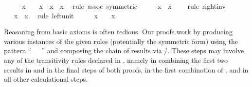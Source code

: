 \begin{isabellebody}
\ \ \isamarkupfalse%
\ \isamarkupfalse%
\ {}x\ {}\ {}\ {}\ {}x\ {}\ x{}{}\ {}\ x{}\ \isamarkupfalse%
\ {}rule\ assoc\ {}symmetric{}{}\isanewline
\ \ \isamarkupfalse%
\ \isamarkupfalse%
\ {}x\ {}\ x{}\ {}\ {}{}\ \isamarkupfalse%
\ {}rule\ right{}inv{}\isanewline
\ \ \isamarkupfalse%
\ \isamarkupfalse%
\ {}{}\ {}\ x\ {}\ x{}\ \isamarkupfalse%
\ {}rule\ left{}unit{}\isanewline
\ \ \isamarkupfalse%
\ \isamarkupfalse%
\ {}x\ {}\ {}\ {}\ x{}\ \isamarkupfalse%
\isanewline
{}\isamarkupfalse%
%
\endisatagproof
{\isafoldproof}%
%
\isadelimproof
%
\endisadelimproof
%
\begin{isamarkuptext}%
\noindent Reasoning from basic axioms is often tedious.  Our proofs
  work by producing various instances of the given rules (potentially
  the symmetric form) using the pattern ``\hyperlink{command.have}{\mbox{}}~~\hyperlink{command.by}{\mbox{}}~'' and composing the chain of
  results via \hyperlink{command.also}{\mbox{}}/\hyperlink{command.finally}{\mbox{}}.  These steps may
  involve any of the transitivity rules declared in
  , namely  in combining
  the first two results in  and in the final steps of
  both proofs,  in the first combination of , and  in all other calculational steps.


\end{isamarkuptext}
\end{isabellebody}
